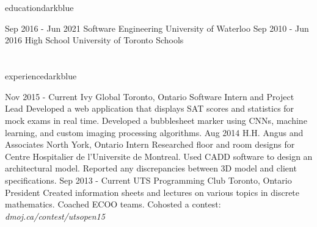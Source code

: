 \documentclass{resume}
\begin{document}
	\begin{main}
		\vspace{10pt}%
		\section{\faBook}{education}{darkblue}
			\begin{entrylist}
				\rightentry%
				{Sep 2016 - Jun 2021}%
				{Software Engineering}%
				{University of Waterloo}%
				{}{}
				\rightentry%
				{Sep 2010 - Jun 2016}%
				{High School}%
				{University of Toronto Schools}%
				{}{}
			\end{entrylist}
		\section{\faBriefcase}{experience}{darkblue}
			\begin{entrylist}
				\rightentry%
					{Nov 2015 - Current}%
					{Ivy Global}%
					{Toronto, Ontario}%
					{Software Intern and Project Lead}%
					{Developed a web application that displays SAT scores and statistics for mock exams in real time. Developed a bubblesheet marker using CNNs, machine learning, and custom imaging processing algorithms.}
				\rightentry%
					{Aug 2014}%
					{H.H. Angus and Associates}%
					{North York, Ontario}%
					{Intern}%
					{Researched floor and room designs for Centre Hospitalier de l'Universite de Montreal. Used CADD software to design an architectural model. Reported any discrepancies between 3D model and client specifications.}
				\rightentry%
					{Sep 2013 - Current}%
					{UTS Programming Club}%
					{Toronto, Ontario}%
					{President}%
					{Created information sheets and lectures on various topics in discrete mathematics. Coached ECOO teams. Cohosted a contest: \emph{dmoj.ca/contest/utsopen15}}
			\end{entrylist}

\end{main}
\end{document}

